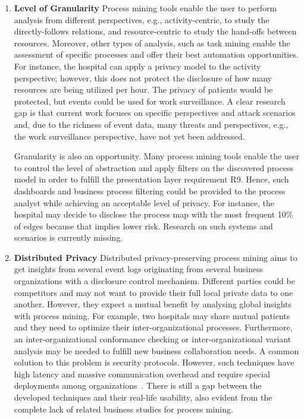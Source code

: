 \documentclass[manuscript]{acmart}
\begin{document}
\begin{enumerate}
\item \textbf{Level of Granularity}
Process mining tools enable the user to perform analysis from different perspectives, e.g., activity-centric, to study the directly-follows relations, and resource-centric to study the hand-offs between resources. Moreover, other types of analysis, such as task mining enable the assessment of specific processes and offer their best automation opportunities. For instance, the hospital can apply a privacy model to the activity perspective; however, this does not protect the disclosure of how many resources are being utilized per hour. The privacy of patients would be protected, but events could be used for work surveillance. A clear research gap is that current work focuses on specific perspectives and attack scenarios and, due to the richness of event data, many threats and perspectives, e.g., the work surveillance perspective, have not yet been addressed.

Granularity is also an opportunity. Many process mining tools enable the user to control the level of abstraction and apply filters on the discovered process model in order to fulfill the presentation layer requirement R9. Hence, such dashboards and business process filtering \cite{zaman2019process} could be provided to the process analyst while achieving an acceptable level of privacy. For instance, the hospital may decide to disclose the process map with the most frequent 10\% of edges because that implies lower risk. Research on such systems and scenarios is currently missing.

\item\textbf{Distributed Privacy}
Distributed privacy-preserving process mining aims to get insights from several event logs originating from several business organizations with a disclosure control mechanism. Different parties could be competitors and may not want to provide their full local private data to one another. However, they expect a mutual benefit by analysing global insights with process mining. %
For example, two hospitals may share mutual patients and they need to optimize their inter-organizational processes. Furthermore, an inter-organizational conformance checking or inter-organizational variant analysis may be needed to fulfill new business collaboration needs.
A common solution to this problem is security protocols. However, such techniques have high latency and massive communication overhead and require special deployments among organizations~\cite{elkoumy2020secure}. There is still a gap between the developed techniques and their real-life usability, also evident from the complete lack of related business studies for process mining. 


\end{enumerate}
\end{document}
